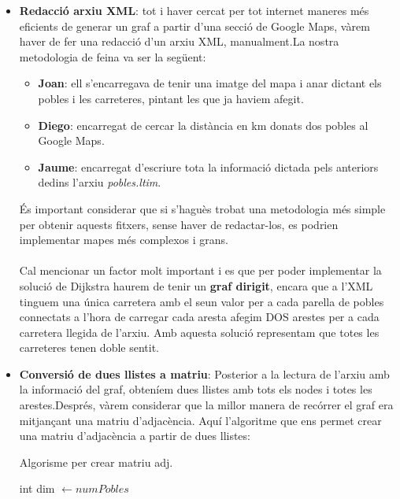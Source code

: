 \documentclass[conference]{IEEEtran}
\begin{document}
        \begin{itemize}
            \item \textbf{Redacció arxiu XML}: tot i haver cercat per tot internet maneres més eficients de generar un graf a partir d'una secció de Google Maps, vàrem haver de fer una redacció d'un arxiu XML, manualment.La nostra metodologia de feina va ser la següent:
    
                \begin{itemize}
                    \item \textbf{Joan}: ell s'encarregava de tenir una imatge del mapa i anar dictant els pobles i les carreteres, pintant les que ja haviem afegit.
                    \item \textbf{Diego}: encarregat de cercar la distància en km donats dos pobles al Google Maps.
                    \item \textbf{Jaume}: encarregat d'escriure tota la informació dictada pels anteriors dedins l'arxiu \textit{pobles.ltim}.
                \end{itemize}
            
            
            És important considerar que si s'haguès trobat una metodologia més simple per obtenir aquests fitxers, sense haver de redactar-los, es podrien implementar mapes més complexos i grans.\\\\
            Cal mencionar un factor molt important i es que per poder implementar la solució de Dijkstra haurem de tenir un \textbf{graf dirigit}, encara que a l'XML tinguem una única carretera amb el seun valor per a cada parella de pobles connectats a l'hora de carregar cada aresta afegim DOS arestes per a cada carretera llegida de l'arxiu. Amb aquesta solució representam que totes les carreteres tenen doble sentit.\\
            \item \textbf{Conversió de dues llistes a matriu}: Posterior a la lectura de l'arxiu amb la informació del graf, obteníem dues llistes amb tots els nodes i totes les arestes.Després, vàrem considerar que la millor manera de recórrer el graf era mitjançant una matriu d'adjacència. Aquí l'algoritme que ens permet crear una matriu d'adjacència a partir de dues llistes: 
    
            \begin{algorithm}
                \caption{Algorisme per crear matriu adj.}
                \begin{algorithmic}[1]
                \State int dim $\gets numPobles$
    

\end{algorithmic}
\end{algorithm}
\end{itemize}
\end{document}
